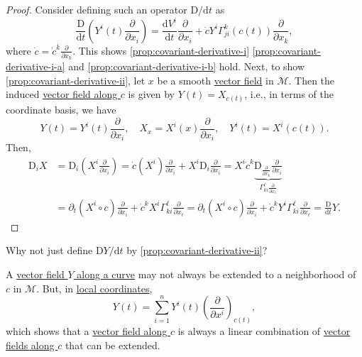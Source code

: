 \begin{proof}
	Consider defining such an operator \(\mathrm{D} / \mathrm{d} t\) as
	\[
		\frac{\mathrm{D}}{\mathrm{d}t} \left( Y^i (t)\frac{\partial}{\partial x_i} \right)
		= \frac{\mathrm{d}V^i}{\mathrm{d}t} \frac{\partial}{\partial x_i} + \dot{c}Y^i \Gamma _{ji}^k(c(t)) \frac{\partial}{\partial x_k},
	\]
	where \(\dot{c} = \dot{c}^k \frac{\partial}{\partial x_k}\). This shows \autoref{prop:covariant-derivative-i} \autoref{prop:covariant-derivative-i-a} and \autoref{prop:covariant-derivative-i-b} hold. Next, to show \autoref{prop:covariant-derivative-ii}, let \(x\) be a smooth \hyperref[def:vector-field]{vector field} in \(\mathcal{M} \). Then the induced \hyperref[def:vector-field-along-curve]{vector field along \(c\)} is given by \(Y(t)=X_{c(t)}\), i.e., in terms of the coordinate basis, we have
	\[
		Y(t) = Y^i(t)\frac{\partial}{\partial x_i},\quad X_x= X^i(x)\frac{\partial}{\partial x_i},\quad Y^i(t) = X^i (c(t)).
	\]
	Then,
	\[
		\begin{split}
			\mathrm{D} _i X
			&= \mathrm{D} _i \left( X^i \frac{\partial}{\partial x_i} \right)
			= \dot{c}(X^i)\frac{\partial}{\partial x_i} + X^i \mathrm{D} _i\frac{\partial}{\partial x_i}
			= X^i \dot{c}^k \underbrace{\mathrm{D} _{\frac{\partial}{\partial x_k}} \frac{\partial}{\partial x_i}}_{\Gamma _{ki}^{\ell } \frac{\partial}{\partial x_{\ell}}}\\
			&= \partial _t(X^i \circ c)\frac{\partial}{\partial x_i} + \dot{c}^k X^i \Gamma ^\ell _{ki} \frac{\partial}{\partial x_{\ell}}
			= \partial _t(X^i \circ c)\frac{\partial}{\partial x_i} + \dot{c}^k Y^i \Gamma ^\ell _{ki} \frac{\partial}{\partial x_{\ell }}
			= \frac{\mathrm{D}}{\mathrm{d} t} Y.
		\end{split}
	\]
\end{proof}

\begin{problem}
Why not just define \(\mathrm{D} Y / \mathrm{d} t\) by \autoref{prop:covariant-derivative-ii}?
\end{problem}
\begin{answer}
	A \hyperref[def:vector-field-along-curve]{vector field \(Y\) along a curve} may not always be extended to a neighborhood of \(c\) in \(\mathcal{M} \). But, in \hyperref[def:coordinate-chart]{local coordinates},
	\[
		Y(t) = \sum_{i=1}^{n} Y^i (t) \left( \frac{\partial }{\partial x^i}  \right) _{c(t)},
	\]
	which shows that a \hyperref[def:vector-field-along-curve]{vector field along \(c\)} is always a linear combination of \hyperref[def:vector-field-along-curve]{vector fields along \(c\)} that can be extended.
\end{answer}

